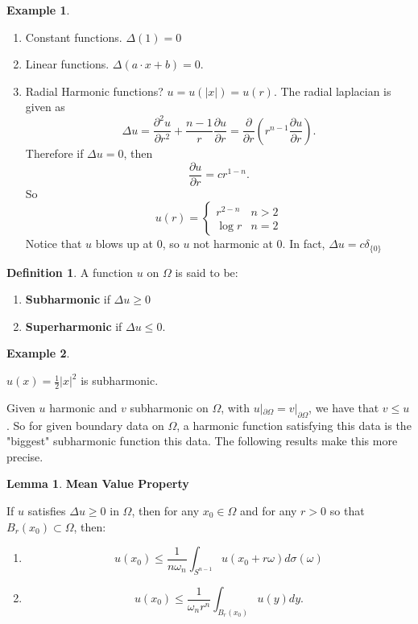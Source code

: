 \documentclass[12pt, a4paper]{article}
\theoremstyle{definition}
\newtheorem{lemma}{Lemma}
\newtheorem{defn}{Definition}
\newtheorem{example}{Example}
\newcommand{\bd}{\partial}
\begin{document}
\begin{tcolorbox}[colback = white]
\begin{example}
\end{example}
	\begin{enumerate}[label = \roman*)]
		\item 	Constant functions. $\Delta (1) = 0$
\item 	Linear functions. $\Delta( a\cdot x + b) = 0$. 
\item Radial Harmonic functions? $u = u(|x|)= u(r)$. The radial laplacian is given as
	$$ \Delta u = \frac{ \partial^2 u}{ \partial r^2 } + \frac{ n-1 }{ r } \frac{ \partial u }{ \partial r } = \frac{ \partial  }{ \partial r } \left( r^{n-1} \frac{ \partial u  }{ \partial r } \right). $$ 
Therefore if $\Delta u = 0$, then 
			$$ \frac{ \partial u  }{ \partial r  }= cr^{1-n} .$$
So 
			$$ u(r) = \begin{cases}
				r^{2-n} & n>2
				 \\ \log r & n=2
			\end{cases} $$ 
Notice that $u$ blows up at $0$, so $u$ not harmonic at $0$. In fact, $\Delta u = c \delta_{\{0\}}$ 
	\end{enumerate}
\end{tcolorbox}
\begin{tcolorbox}[colback = white]
\begin{defn}
A function $u$ on $\Omega$ is said to be: 
\begin{enumerate}[label = \roman*)]
	\item  \textbf{Subharmonic} if $\Delta u \geq 0$
	\item \textbf{Superharmonic} if $\Delta u \leq 0$. 
\end{enumerate}
\end{defn}
\end{tcolorbox}
\begin{tcolorbox}[colback = white]
\begin{example}
\end{example} $u(x) = \frac{ 1 }{ 2 }|x|^2$ is subharmonic. 
\end{tcolorbox}
Given $u$ harmonic and $v$ subharmonic on $\Omega$, with $u|_{\bd \Omega} = v|_{\bd \Omega}$, we have that $v \leq u$. So for given boundary data on $\Omega$, a harmonic function satisfying this data is the "biggest" subharmonic function this data. The following results make this more precise. 
\begin{tcolorbox}
\begin{lemma}
	\textbf{Mean Value Property}
\end{lemma}
If $u$ satisfies $\Delta u \geq 0$ in $\Omega$, then for any $x_0 \in \Omega$ and for any $r>0$ so that $B_r(x_0) \subset \Omega$, then:
\begin{enumerate}[label = \roman*)]
	\item $$u(x_0) \leq \frac{ 1 }{ n \omega_n } \int_{S^{n-1}}u(x_0 + r\omega) d\sigma(\omega) $$
	\item $$ u(x_0) \leq \frac{ 1 }{ \omega_n r^n } \int_{B_r(x_0)} u(y) dy. $$ 
\end{enumerate}
\end{tcolorbox}
\end{document}

